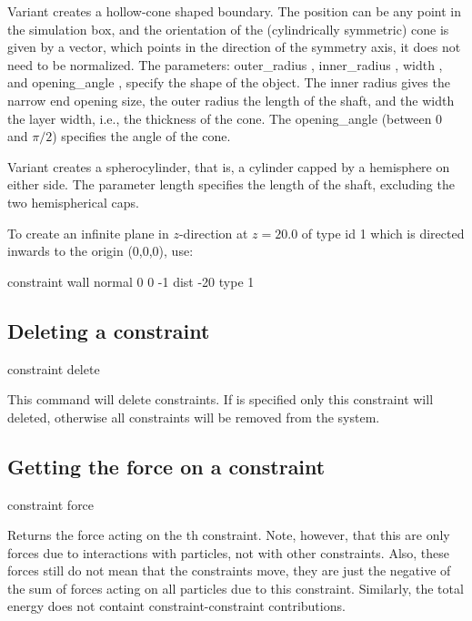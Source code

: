 Variant  creates a hollow-cone shaped boundary. The position can be any point in the simulation
box, and the orientation of the (cylindrically symmetric) cone is
given by a vector, which points in the direction of the symmetry axis, it
does not need to be normalized. The parameters: outer_radius ,
inner_radius , width , and opening_angle , specify the shape of the object. The inner radius gives the narrow end opening size, the outer radius the length of the shaft, and the width the layer width, i.e., the thickness of the cone. The opening_angle (between 0 and $\pi/2$) specifies the angle of the cone. 

Variant  creates a spherocylinder, that is, a cylinder capped by a hemisphere on either side. The parameter length  specifies the length of the shaft, excluding the two hemispherical caps. 



To create an infinite plane in $z$-direction at $z=20.0$ of type id 1 which is directed inwards to the origin (0,0,0),
use:
\begin{tclcode}
  constraint wall normal 0 0 -1 dist -20 type 1
\end{tclcode}

\subsection{Deleting a constraint}
\begin{essyntax}
  constraint delete  
\end{essyntax}

This command will delete constraints. If  is specified only this
constraint will deleted, otherwise all constraints will be removed from the
system. 

\subsection{Getting the force on a constraint}
\begin{essyntax}
constraint force  
\end{essyntax}
Returns the force acting on the th constraint. Note, however, that this
are only forces due to interactions with particles, not with other constraints.
Also, these forces still do not mean that the constraints move, they are just
the negative of the sum of forces acting on all particles due to this constraint.
Similarly, the total energy does not containt constraint-constraint contributions.


